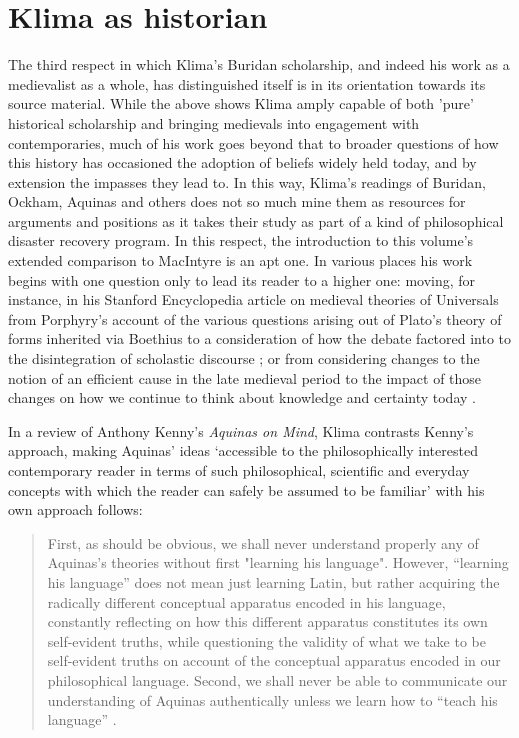 \documentclass[]{article}
\begin{document}
\section{Klima as historian}
The third respect in which Klima's Buridan scholarship, 
and indeed his work as a medievalist as a whole, 
has distinguished itself 
is in its orientation 
towards its source material. 
While the above shows Klima amply capable of 
both 
'pure' historical scholarship 
and 
bringing medievals into engagement with contemporaries, 
much of his work goes beyond that to 
broader questions of 
how this history has occasioned
the adoption of beliefs widely held today,
and by extension the impasses they lead to.
In this way, 
Klima's readings of Buridan, 
Ockham, 
Aquinas 
and others 
does not so much mine them as resources for arguments and positions 
as it takes their study as part of a kind of philosophical disaster recovery program. 
In this respect, 
the introduction to this volume's extended comparison 
to MacIntyre is an apt one.
In various places 
his work begins with one question only to lead its reader to a higher one: 
moving, for instance, in his Stanford Encyclopedia article on medieval theories of Universals 
from Porphyry's account of the various questions arising out of Plato's theory of forms 
inherited via Boethius
to a consideration of how the debate factored into to the disintegration of scholastic discourse \autocite{sep-universals-medieval}; 
or from considering changes to the notion of an efficient cause in the late medieval period 
to the impact of those changes 
on how we continue to think about knowledge and certainty today \autocite{Klima2013}.

In a review of Anthony Kenny's \emph{Aquinas on Mind}, 
Klima contrasts Kenny's approach, 
making Aquinas' ideas 
`accessible to the philosophically interested contemporary reader 
in terms of such philosophical, scientific and everyday
concepts with which the reader can safely be assumed to be familiar'\autocite[113]{Klima1998}
with his own approach follows:

\begin{quote}
	First, as should be obvious, we shall never understand properly any of
	Aquinas's theories without first "learning his language". However,
	``learning his language'' does not mean just learning Latin, but rather
	acquiring the radically different conceptual apparatus encoded in his
	language, constantly reflecting on how this different apparatus constitutes its own self-evident truths, while questioning the validity of what
	we take to be self-evident truths on account of the conceptual apparatus
	encoded in our philosophical language. 
	Second, we shall never be able to
	communicate our understanding of Aquinas authentically unless we
	learn how to ``teach his language''  \autocite[115]{Klima1998}.
\end{quote} 
\end{document}
